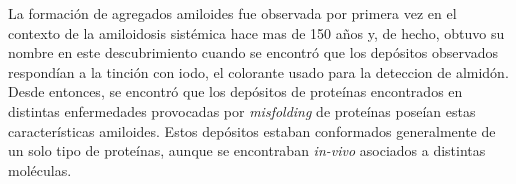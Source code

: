 La formación de agregados amiloides fue observada por primera vez en el contexto de la amiloidosis sistémica hace mas de 150 años y, de hecho, obtuvo su nombre en este descubrimiento cuando se encontró que 
los depósitos observados respondían a la tinción con iodo, el colorante usado para la deteccion de almidón. 
Desde entonces, se encontró que los depósitos de proteínas encontrados en distintas enfermedades provocadas por \textit{misfolding} de proteínas poseían estas características amiloides.
Estos depósitos estaban conformados generalmente de un solo tipo de proteínas, aunque se encontraban \textit{in-vivo} asociados a distintas moléculas.


